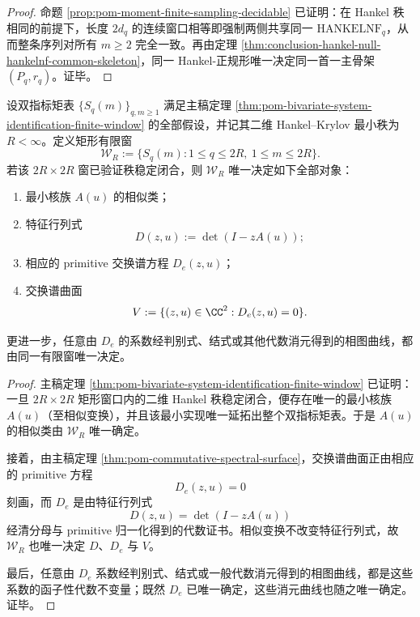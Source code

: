 \begin{proof}
命题 \ref{prop:pom-moment-finite-sampling-decidable} 已证明：在 Hankel 秩相同的前提下，长度 \(2d_q\) 的连续窗口相等即强制两侧共享同一 \(\mathrm{HANKELNF}_q\)，从而整条序列对所有 \(m\ge 2\) 完全一致。再由定理 \ref{thm:conclusion-hankel-null-hankelnf-common-skeleton}，同一 Hankel-正规形唯一决定同一首一主骨架 \((P_q,r_q)\)。证毕。
\end{proof}

\begin{theorem}[二维最小实现的有限窗代数刚性]\label{thm:conclusion-bivariate-minreal-finitewindow-spectral-surface-rigidity}
设双指标矩表 \(\{S_q(m)\}_{q,m\ge 1}\) 满足主稿定理 \ref{thm:pom-bivariate-system-identification-finite-window} 的全部假设，并记其二维 Hankel--Krylov 最小秩为 \(R<\infty\)。定义矩形有限窗
\[
\mathcal W_R:=\{S_q(m):1\le q\le 2R,\ 1\le m\le 2R\}.
\]
若该 \(2R\times 2R\) 窗已验证秩稳定闭合，则 \(\mathcal W_R\) 唯一决定如下全部对象：
\begin{enumerate}
  \item 最小核族 \(A(u)\) 的相似类；
  \item 特征行列式
  \[
  D(z,u):=\det(I-zA(u));
  \]
  \item 相应的 primitive 交换谱方程 \(D_e(z,u)\)；
  \item 交换谱曲面
  \[
  V:=\{(z,u)\in \CC^2:D_e(z,u)=0\}.
  \]
\end{enumerate}
更进一步，任意由 \(D_e\) 的系数经判别式、结式或其他代数消元得到的相图曲线，都由同一有限窗唯一决定。
\end{theorem}

\begin{proof}
主稿定理 \ref{thm:pom-bivariate-system-identification-finite-window} 已证明：一旦 \(2R\times 2R\) 矩形窗口内的二维 Hankel 秩稳定闭合，便存在唯一的最小核族 \(A(u)\)（至相似变换），并且该最小实现唯一延拓出整个双指标矩表。于是 \(A(u)\) 的相似类由 \(\mathcal W_R\) 唯一确定。

接着，由主稿定理 \ref{thm:pom-commutative-spectral-surface}，交换谱曲面正由相应的 primitive 方程
\[
D_e(z,u)=0
\]
刻画，而 \(D_e\) 是由特征行列式
\[
D(z,u)=\det(I-zA(u))
\]
经清分母与 primitive 归一化得到的代数证书。相似变换不改变特征行列式，故 \(\mathcal W_R\) 也唯一决定 \(D\)、\(D_e\) 与 \(V\)。

最后，任意由 \(D_e\) 系数经判别式、结式或一般代数消元得到的相图曲线，都是这些系数的函子性代数不变量；既然 \(D_e\) 已唯一确定，这些消元曲线也随之唯一确定。证毕。
\end{proof}

